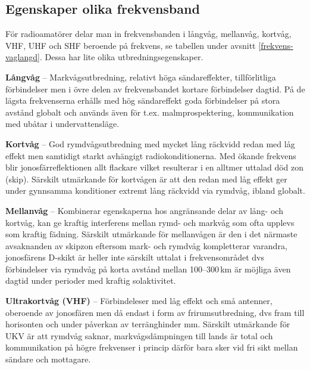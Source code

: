 \subsection{Egenskaper olika frekvensband}

För radioamatörer delar man in frekvensbanden i långvåg, mellanvåg, kortvåg, VHF, UHF och SHF beroende på frekvens, se tabellen under avsnitt \ref{frekvens-vaglangd}. Dessa har lite olika utbredningsegenskaper.

\textbf{Långvåg} -- Markvågsutbredning, relativt höga sändareffekter, tillförlitliga för\-bind\-el\-ser men i övre delen av frekvensbandet kortare förbindelser dagtid. På de lägsta frekvenserna erhålls med hög sändareffekt goda förbindelser på stora avstånd globalt och används även för t.ex. malmprospektering, kommunikation med ubåtar i undervattensläge.

\textbf{Kortvåg} -- God rymdvågsutbredning med mycket lång räckvidd redan med låg effekt men samtidigt starkt avhängigt radiokonditionerna. Med ökande frekvens blir jonosfärreflektionen allt flackare vilket resulterar i en alltmer uttalad död zon (skip). Särskilt utmärkande för kortvågen är att den redan med låg effekt ger under gynnsamma konditioner extremt lång räckvidd via rymdvåg, ibland globalt.

\textbf{Mellanvåg} -- Kombinerar egenskaperna hos angränsande delar av lång- och kortvåg, kan ge kraftig interferens mellan rymd- och markvåg som ofta upplevs som kraftig fädning. Särskilt utmärkande för mellanvågen är den i det närmaste avsaknanden av skipzon eftersom mark- och rymdvåg kompletterar varandra, jonosfärens D-skikt är heller inte särskilt uttalat i frekvensområdet dvs förbindelser via rymdvåg på korta avstånd mellan 100--300\,km är möjliga även dagtid under perioder med kraftig solaktivitet.

\textbf{Ultrakortvåg (VHF)} -- Förbindeleser med låg effekt och små antenner, oberoende av jonosfären men då endast i form av frirumsutbredning, dvs fram till horisonten och under påverkan av terränghinder mm. Särskilt utmärkande för UKV är att rymdvåg saknar, markvågsdämpningen till lands är total och kommunikation på högre frekvenser i princip därför bara sker vid fri sikt mellan sändare och mottagare.

